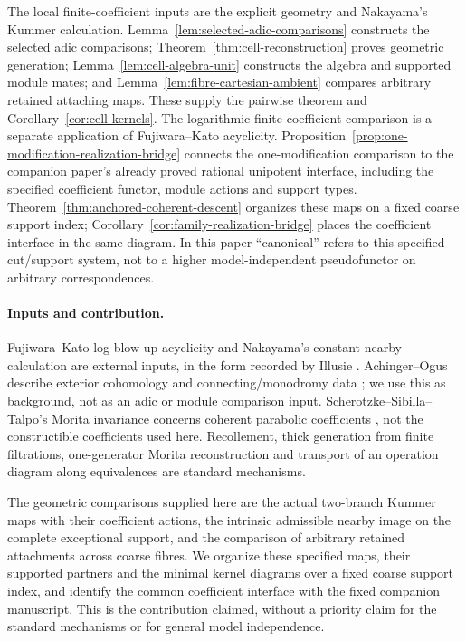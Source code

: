 \documentclass[11pt]{article}
\theoremstyle{definition}
\theoremstyle{remark}
\begin{document}
The local finite-coefficient inputs are the explicit geometry and
Nakayama's Kummer calculation.  Lemma~\ref{lem:selected-adic-comparisons}
constructs the selected adic comparisons; Theorem~\ref{thm:cell-reconstruction}
proves geometric generation; Lemma~\ref{lem:cell-algebra-unit} constructs
the algebra and supported module mates; and
Lemma~\ref{lem:fibre-cartesian-ambient} compares arbitrary retained
attaching maps.  These supply the pairwise theorem and
Corollary~\ref{cor:cell-kernels}.  The logarithmic finite-coefficient
comparison is a separate application of Fujiwara--Kato acyclicity.
Proposition~\ref{prop:one-modification-realization-bridge} connects
the one-modification comparison to the companion paper's already
proved rational unipotent interface, including the specified
coefficient functor, module actions and support types.
Theorem~\ref{thm:anchored-coherent-descent} organizes these maps on a
fixed coarse support index; Corollary~\ref{cor:family-realization-bridge}
places the coefficient interface in the same diagram.  In this paper
``canonical'' refers to this specified cut/support system, not to a
higher model-independent pseudofunctor on arbitrary correspondences.

\paragraph{Inputs and contribution.}
Fujiwara--Kato log-blow-up acyclicity and Nakayama's constant nearby
calculation are external inputs, in the form recorded by Illusie
\cite{IllusieOverview}.  Achinger--Ogus describe exterior cohomology
and connecting/monodromy data \cite[PDF version, \S6.3]{AchingerOgus};
we use this as background, not as an adic or module comparison input.
Scherotzke--Sibilla--Talpo's Morita invariance concerns coherent
parabolic coefficients \cite{SSTMcKay}, not the constructible
coefficients used here.  Recollement, thick generation from finite
filtrations, one-generator Morita reconstruction and transport of an
operation diagram along equivalences are standard mechanisms.

The geometric comparisons supplied here are the actual two-branch
Kummer maps with their coefficient actions, the intrinsic admissible
nearby image on the complete exceptional support, and the comparison
of arbitrary retained attachments across coarse fibres.  We organize
these specified maps, their supported partners and the minimal kernel
diagrams over a fixed coarse support index, and identify the common
coefficient interface with the fixed companion manuscript.
This is the contribution claimed, without a priority claim for the
standard mechanisms or for general model independence.
\end{document}
